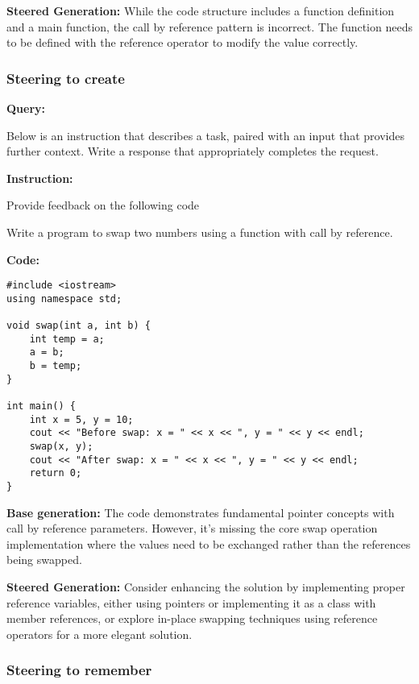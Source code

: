 \textbf{Steered Generation:} While the code structure includes a function definition and a main function, the call by reference pattern is incorrect. The function needs to be defined with the reference operator to modify the value correctly.



\medskip
\subsubsection*{Steering to create}
\textbf{Query:}\par

Below is an instruction that describes a task, paired with an input that provides further context. Write a response that appropriately completes the request.\par

\textbf{Instruction:}\par
Provide feedback on the following code\par
Write a program to swap two numbers using a function with call by reference.\par

\textbf{Code:}
\begin{lstlisting}
#include <iostream>
using namespace std;

void swap(int a, int b) {
    int temp = a;
    a = b;
    b = temp;
}

int main() {
    int x = 5, y = 10;
    cout << "Before swap: x = " << x << ", y = " << y << endl;
    swap(x, y);
    cout << "After swap: x = " << x << ", y = " << y << endl;
    return 0;
}
\end{lstlisting}

\textbf{Base generation:}  The code demonstrates fundamental pointer concepts with call by reference parameters. However, it's missing the core swap operation implementation where the values need to be exchanged rather than the references being swapped.

\textbf{Steered Generation:} Consider enhancing the solution by implementing proper reference variables, either using pointers or implementing it as a class with member references, or explore in-place swapping techniques using reference operators for a more elegant solution.

\medskip


\subsubsection*{Steering to remember}


